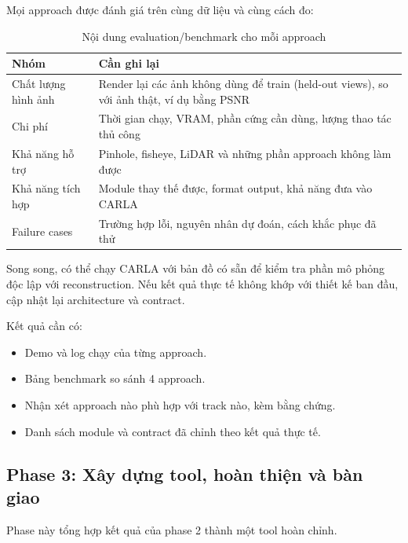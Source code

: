 Mọi approach được đánh giá trên cùng dữ liệu và cùng cách đo:
\begin{table}[H]
  \centering
  \caption{Nội dung evaluation/benchmark cho mỗi approach}
  \begin{tabularx}{\linewidth}{>{\raggedright\arraybackslash}p{3.5cm} X}
    \toprule
    \textbf{Nhóm} & \textbf{Cần ghi lại} \\
    \midrule
    Chất lượng hình ảnh & Render lại các ảnh không dùng để train (held-out views), so với ảnh thật, ví dụ bằng PSNR \\
    \addlinespace
    Chi phí & Thời gian chạy, VRAM, phần cứng cần dùng, lượng thao tác thủ công \\
    \addlinespace
    Khả năng hỗ trợ & Pinhole, fisheye, LiDAR và những phần approach không làm được \\
    \addlinespace
    Khả năng tích hợp & Module thay thế được, format output, khả năng đưa vào CARLA \\
    \addlinespace
    Failure cases & Trường hợp lỗi, nguyên nhân dự đoán, cách khắc phục đã thử \\
    \bottomrule
  \end{tabularx}
\end{table}

Song song, có thể chạy CARLA với bản đồ có sẵn để kiểm tra phần mô phỏng độc lập với reconstruction.
Nếu kết quả thực tế không khớp với thiết kế ban đầu, cập nhật lại architecture và contract.

Kết quả cần có:
\begin{itemize}
  \item Demo và log chạy của từng approach.
  \item Bảng benchmark so sánh 4 approach.
  \item Nhận xét approach nào phù hợp với track nào, kèm bằng chứng.
  \item Danh sách module và contract đã chỉnh theo kết quả thực tế.
\end{itemize}

\subsection{Phase 3: Xây dựng tool, hoàn thiện và bàn giao}

Phase này tổng hợp kết quả của phase 2 thành một tool hoàn chỉnh.

